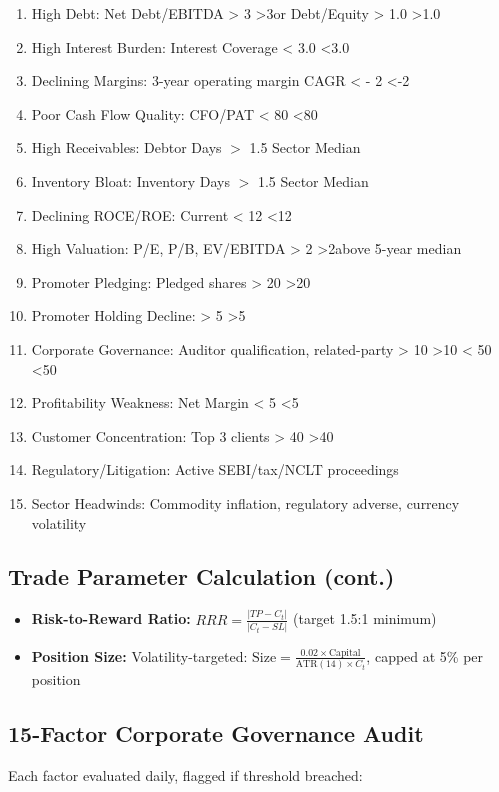 \documentclass[12pt,a4paper]{report}
\begin{document}
\begin{enumerate}
\item High Debt: Net Debt/EBITDA 
>
3
\times
>3\times or Debt/Equity 
>
1.0
>1.0
\item High Interest Burden: Interest Coverage 
<
3.0
\times
<3.0\times
\item Declining Margins: 3-year operating margin CAGR 
<
-
2
%
<-2%
\item Poor Cash Flow Quality: CFO/PAT 
<
80
%
<80%
\item High Receivables: Debtor Days $>$ 1.5 
\times
\times Sector Median
\item Inventory Bloat: Inventory Days $>$ 1.5 
\times
\times Sector Median
\item Declining ROCE/ROE: Current 
<
12
%
<12%
\item High Valuation: P/E, P/B, EV/EBITDA 
>
2
\sigma
>2\sigma above 5-year median
\item Promoter Pledging: Pledged shares 
>
20
%
>20%
\item Promoter Holding Decline: 
>
5
%
>5%
\item Corporate Governance: Auditor qualification, related-party 
>
10
%
>10%
<
50
%
<50%
\item Profitability Weakness: Net Margin 
<
5
%
<5%
\item Customer Concentration: Top 3 clients 
>
40
%
>40%
\item Regulatory/Litigation: Active SEBI/tax/NCLT proceedings
\item Sector Headwinds: Commodity inflation, regulatory adverse, currency volatility
\end{enumerate}

\subsection{Trade Parameter Calculation (cont.)}
\begin{itemize}
\item \textbf{Risk-to-Reward Ratio:} $RRR = \frac{|TP - C_t|}{|C_t - SL|}$ (target 1.5:1 minimum)
\item \textbf{Position Size:} Volatility-targeted: $\text{Size} = \frac{0.02 \times \text{Capital}}{\text{ATR}(14) \times C_t}$, capped at 5\% per position
\end{itemize}

\subsection{15-Factor Corporate Governance Audit}
Each factor evaluated daily, flagged if threshold breached:
\end{document}
